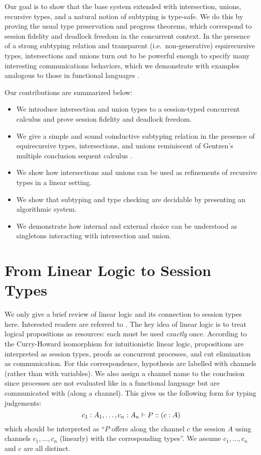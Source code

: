 \documentclass[a4paper,USenglish]{lipics-v2016}
\begin{document}
Our goal is to show that the base system extended with intersection, unions, recursive types, and a natural notion of subtyping is type-safe. We do this by proving the usual type preservation and progress theorems, which correspond to session fidelity and deadlock freedom in the concurrent context. In the presence of a strong subtyping relation and transparent (i.e.\ non-generative)  equirecursive types, intersections and unions turn out to be powerful enough to specify many interesting communications behaviors, which we demonstrate with examples analogous to those in functional languages \cite{FreemanP91,Dunfield03fossacs}.

Our contributions are summarized below:
\begin{itemize}
  \item We introduce intersection and union types to a session-typed concurrent calculus and prove session fidelity and deadlock freedom.
  \item We give a simple and sound coinductive subtyping relation in the presence of equirecursive types, intersections, and unions reminiscent of Gentzen's multiple conclusion sequent calculus \cite{Gentzen35, Girard87}.
  \item We show how intersections and unions can be used as refinements of recursive types in a linear setting.
  \item We show that subtyping and type checking are decidable by presenting an algorithmic system.
  \item We demonstrate how internal and external choice can be understood as singletons interacting with intersection and union.
\end{itemize}


\section{From Linear Logic to Session Types}
\label{base}
We only give a brief review of linear logic and its connection to session types here. Interested readers are referred to \cite{CairesP10, PfenningG15, Honda93}. The key idea of linear logic is to treat logical propositions as resources: each must be used \emph{exactly} once. According to the Curry-Howard isomorphism for intuitionistic linear logic, propositions are interpreted as session types, proofs as concurrent processes, and cut elimination as communication. For this correspondence, hypothesis are labelled with channels (rather than with variables). We also assign a channel name to the conclusion since processes are not evaluated like in a functional language but are communicated with (along a channel). This gives us the following form for typing judgements:
$$ c_1 : A_1, \ldots, c_n : A_n \vdash P :: (c : A)$$
which should be interpreted as ``$P$ offers along the channel $c$ the session $A$ using channels $c_1, \ldots, c_n$ (linearly) with the corresponding types''. We assume $c_1, \ldots, c_n$ and $c$ are all distinct.
\end{document}

